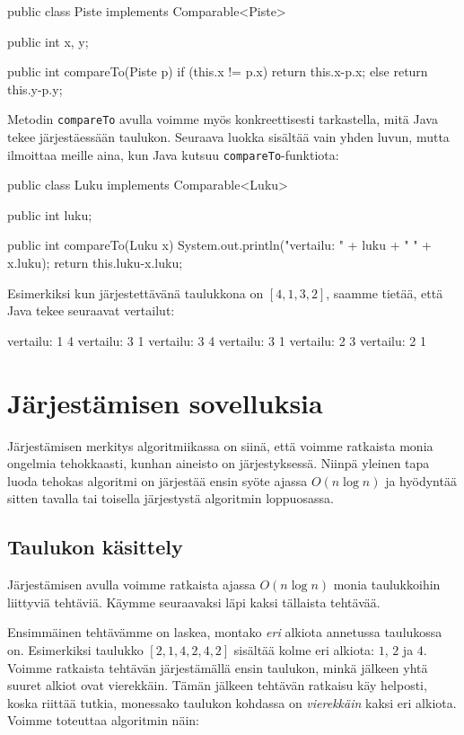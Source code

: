 \begin{code}
public class Piste implements Comparable<Piste> {
    public int x, y;

    public int compareTo(Piste p) {
        if (this.x != p.x) {
            return this.x-p.x;
        } else {
            return this.y-p.y;
        }
    }
}
\end{code}

Metodin \texttt{compareTo} avulla voimme myös konkreettisesti
tarkastella, mitä Java tekee järjestäessään taulukon.
Seuraava luokka sisältää vain yhden luvun,
mutta ilmoittaa meille aina, kun Java kutsuu
\texttt{compareTo}-funktiota:

\begin{code}
public class Luku implements Comparable<Luku> {
    public int luku;

    public int compareTo(Luku x) {
        System.out.println("vertailu: " + luku + " " + x.luku);
        return this.luku-x.luku;
    }
}
\end{code}

Esimerkiksi kun järjestettävänä taulukkona on $[4,1,3,2]$,
saamme tietää, että Java tekee seuraavat vertailut:

\begin{code}
vertailu: 1 4
vertailu: 3 1
vertailu: 3 4
vertailu: 3 1
vertailu: 2 3
vertailu: 2 1
\end{code}

\section{Järjestämisen sovelluksia}

Järjestämisen merkitys algoritmiikassa on siinä,
että voimme ratkaista monia ongelmia tehokkaasti, 
kunhan aineisto on järjestyksessä.
Niinpä yleinen tapa luoda tehokas algoritmi on järjestää
ensin syöte ajassa $O(n \log n)$ ja hyödyntää sitten
tavalla tai toisella järjestystä algoritmin loppuosassa.

\subsection{Taulukon käsittely}

Järjestämisen avulla voimme ratkaista ajassa
$O(n \log n)$ monia taulukkoihin liittyviä tehtäviä.
Käymme seuraavaksi läpi kaksi tällaista tehtävää.

Ensimmäinen tehtävämme on laskea,
montako \emph{eri} alkiota annetussa taulukossa on.
Esimerkiksi taulukko $[2,1,4,2,4,2]$ sisältää kolme
eri alkiota: $1$, $2$ ja $4$.
Voimme ratkaista tehtävän järjestämällä ensin taulukon,
minkä jälkeen yhtä suuret alkiot ovat vierekkäin.
Tämän jälkeen tehtävän ratkaisu käy helposti,
koska riittää tutkia, monessako taulukon kohdassa on
\emph{vierekkäin} kaksi eri alkiota.
Voimme toteuttaa algoritmin näin:

